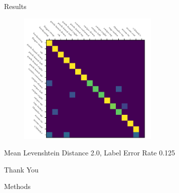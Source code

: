 \documentclass{beamer}
\begin{document}
\begin{frame}{Results}
  \begin{figure}[h]
    \centering
    \includegraphics[height=2.5in]{figures/confusion-matrix}
  \end{figure}
  Mean Levenshtein Distance 2.0, Label Error Rate 0.125
\end{frame}

\begin{frame}[standout]{}
  Thank You
\end{frame}

\appendix

\begin{frame}{Methods}
  \vspace{0.2in}
\end{frame}
\end{document}
